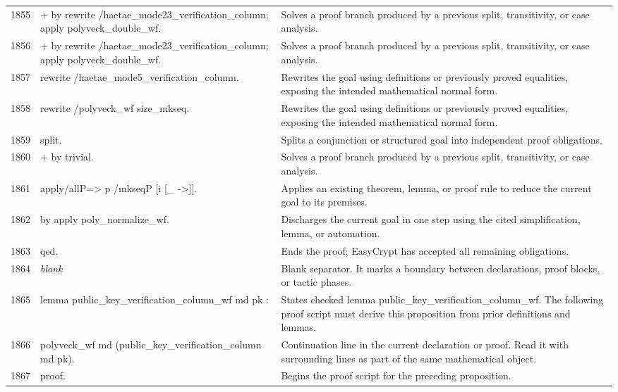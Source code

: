 \documentclass[10pt]{article}
\begin{document}
\begin{longtable}{r L{0.53\textwidth} L{0.37\textwidth}}
1855 & {\ttfamily\scriptsize + by rewrite /haetae\_mode23\_verification\_column; apply polyveck\_double\_wf.} & Solves a proof branch produced by a previous split, transitivity, or case analysis. \\
1856 & {\ttfamily\scriptsize + by rewrite /haetae\_mode23\_verification\_column; apply polyveck\_double\_wf.} & Solves a proof branch produced by a previous split, transitivity, or case analysis. \\
1857 & {\ttfamily\scriptsize rewrite /haetae\_mode5\_verification\_column.} & Rewrites the goal using definitions or previously proved equalities, exposing the intended mathematical normal form. \\
1858 & {\ttfamily\scriptsize rewrite /polyveck\_wf size\_mkseq.} & Rewrites the goal using definitions or previously proved equalities, exposing the intended mathematical normal form. \\
1859 & {\ttfamily\scriptsize split.} & Splits a conjunction or structured goal into independent proof obligations. \\
1860 & {\ttfamily\scriptsize + by trivial.} & Solves a proof branch produced by a previous split, transitivity, or case analysis. \\
1861 & {\ttfamily\scriptsize apply/allP=> p /mkseqP [i [\_ ->]].} & Applies an existing theorem, lemma, or proof rule to reduce the current goal to its premises. \\
1862 & {\ttfamily\scriptsize by apply poly\_normalize\_wf.} & Discharges the current goal in one step using the cited simplification, lemma, or automation. \\
1863 & {\ttfamily\scriptsize qed.} & Ends the proof; EasyCrypt has accepted all remaining obligations. \\
1864 & {\ttfamily\scriptsize \emph{blank}} & Blank separator.  It marks a boundary between declarations, proof blocks, or tactic phases. \\
1865 & {\ttfamily\scriptsize lemma public\_key\_verification\_column\_wf md pk :} & States checked lemma public\_key\_verification\_column\_wf.  The following proof script must derive this proposition from prior definitions and lemmas. \\
1866 & {\ttfamily\scriptsize   polyveck\_wf md (public\_key\_verification\_column md pk).} & Continuation line in the current declaration or proof.  Read it with surrounding lines as part of the same mathematical object. \\
1867 & {\ttfamily\scriptsize proof.} & Begins the proof script for the preceding proposition. \\

\end{longtable}
\end{document}
